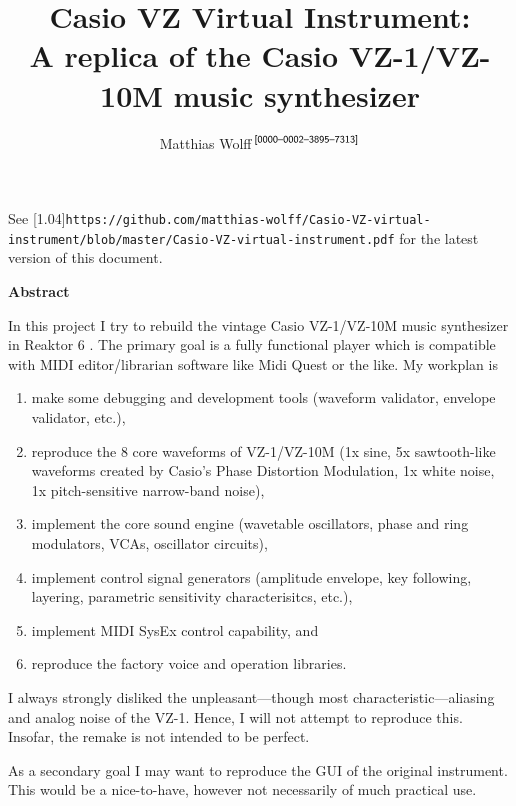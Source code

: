 \documentclass[a4paper]{article}
\newcommand{\TT}[1]{\protect\scalebox{0.75}[1.04]{\texttt{#1}}}
\begin{document}
%
\author{Matthias Wolff$^{\text{\sf\,[0000--0002--3895--7313]}}$}
\title{Casio VZ Virtual Instrument:\\
A replica of the Casio VZ-1/VZ-10M music synthesizer}
\maketitle

\bigskip\noindent
See \TT{https://github.com/matthias-wolff/Casio-VZ-virtual-instrument/blob/master/Casio-VZ-virtual-instrument.pdf}
for the latest version of this document.
\begin{center}
  \bigskip\bigskip
  \begin{minipage}{0.9\linewidth}
    \textbf{Abstract}

    \bigskip
In this project I try to rebuild the vintage Casio VZ-1/VZ-10M music synthesizer
in Reaktor 6 \cite{Reaktor6}. The primary goal is a fully functional player
which is compatible with MIDI editor/librarian software like Midi Quest
\cite{MidiQuest12} or the like. My workplan is
\begin{enumerate}   
  \item 
    make some debugging and development tools (waveform validator, envelope
    validator, etc.),
  \item
    reproduce the 8 core waveforms of VZ-1/VZ-10M (1x sine, 5x sawtooth-like
    waveforms created by Casio's Phase Distortion Modulation, 1x white noise, 1x
    pitch-sensitive narrow-band noise),
  \item
    implement the core sound engine (wavetable oscillators, phase and ring
    modulators, VCAs, oscillator circuits),
  \item
    implement control signal generators (amplitude envelope, key following,
    layering, parametric sensitivity characterisitcs, etc.),
  \item
    implement MIDI SysEx control capability, and
  \item
    reproduce the factory voice and operation libraries.
\end{enumerate}
I always strongly disliked the unpleasant---though most
characteristic---aliasing and analog noise of the VZ-1. Hence, I will not
attempt to reproduce this. Insofar, the remake is not intended to be perfect.

As a secondary goal I may want to reproduce the GUI of the original instrument.
This would be a nice-to-have, however not necessarily of much practical use.

  \end{minipage}
  \vfill
  \vfill
\end{center}
\clearpage
\end{document}
